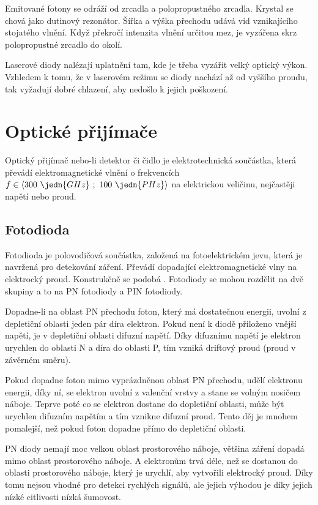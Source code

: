 Emitované fotony se odráží od zrcadla a polopropustného zrcadla.  Krystal se chová jako dutinový rezonátor. Šířka a výška přechodu udává vid vznikajícího stojatého vlnění. Když překročí intenzita vlnění určitou mez, je vyzářena skrz polopropustné zrcadlo do okolí.

Laserové diody nalézají uplatnění tam, kde je třeba vyzářit velký optický výkon. Vzhledem k tomu, že v laserovém režimu se diody nachází až od vyššího proudu, tak vyžadují dobré chlazení, aby nedošlo k jejich poškození.

\section{Optické přijímače}
Optický přijímač nebo-li detektor či čidlo je elektrotechnická součástka, která převádí elektromagnetické vlnění o frekvencích $f \in \langle 300~\jedn{GHz}~;~100~\jedn{PHz} \rangle$ na elektrickou veličinu, nejčastěji napětí nebo proud.

\subsection{Fotodioda}
Fotodioda je polovodičová součástka, založená na fotoelektrickém jevu, která je navržená pro detekování záření. Převádí dopadající elektromagnetické vlny na elektrocký proud. Konstrukčně se podobá . Fotodiody se
mohou rozdělit na dvě skupiny a to na PN fotodiody a PIN fotodiody.

Dopadne-li na oblast PN přechodu foton, který má dostatečnou energii, uvolní z depletiční oblasti jeden pár díra elektron. Pokud není k diodě přiloženo vnější napětí, je v depletiční oblasti difuzní napětí. Díky difuznímu napětí je elektron urychlen do oblasti N a díra do oblasti P, tím vzniká driftový proud (proud v závěrném směru).

Pokud dopadne foton mimo vyprázdněnou oblast PN přechodu, udělí elektronu energii, díky ní, se elektron uvolní z valenční vrstvy a stane se volným nosičem náboje. Teprve poté co se elektron dostane do dopletiční oblasti, může být urychlen difuzním napětím a tím vznikne difuzní proud. Tento děj je mnohem pomalejší, než pokud foton dopadne přímo do depletiční oblasti.

PN diody nemají moc velkou oblast prostorového náboje, většina záření dopadá mimo oblast prostorového náboje. A elektronům trvá déle, než se dostanou do oblasti prostorového náboje, který je urychlí, aby vytvořili elektrocký proud. Díky tomu nejsou vhodné pro detekci rychlých signálů, ale jejich výhodou je díky jejich nízké citlivosti nízká šumovost.

